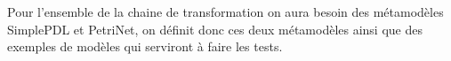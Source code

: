 Pour l'ensemble de la chaine de transformation on aura besoin des métamodèles SimplePDL et PetriNet, on définit donc ces deux métamodèles ainsi que des exemples de modèles qui serviront à faire les tests.
